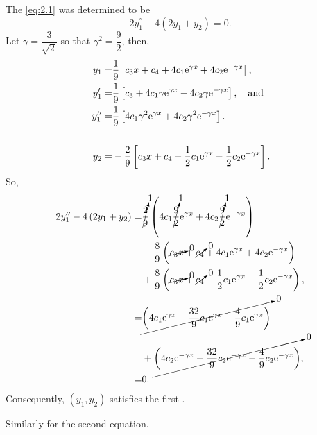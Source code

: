 \def\gm{\dfrac{3}{ \sqrt{2} } }%
\def\g2{\dfrac{9}{2}}
\def\1o9{\frac{1}{9}}%
\def\2o9{\frac{2}{9}}%
\def\4o9{\frac{4}{9}}%
\def\9o2{\frac{9}{2}}%
\def\8o9{\frac{8}{9}}%
\def\32o9{\frac{32}{9}}%
\def\egx{\e^{\gamma x}}%
\def\engx{\e^{-\gamma x}}%
The \el \eqref{eq:2.1} was determined to be
\[
	2y_1^\dprime - 4\left(2y_1+y_2\right) = 0.
\]
Let $\gamma = \gm$ so that $\gamma^2=\g2$, then,
\begin{align*}
	y_1 =& \1o9\left[c_3x + c_4 + 4c_1\e^{\gamma x} + 4c_2\e^{-\gamma x}\right],\\
	y_1^\prime =& \1o9\left[c_3  + 4c_1\gamma\e^{\gamma x} - 4c_2\gamma\e^{-\gamma x}\right],\quad\textrm{and}\\
	y_1^\dprime =&  \1o9\left[4c_1\gamma^2\e^{\gamma x} + 4c_2\gamma^2\e^{-\gamma x}\right].\\\\\
	y_2 =& -\2o9\left[c_3x + c_4-\half c_1\e^{\gamma x} -\half c_2\e^{-\gamma x} \right].
\end{align*}
So,
\begin{align*}
	2y_1^\dprime -4\left(2y_1 + y_2\right) =&\cancelto{1}{\2o9}\left(4c_1\cancelto{1}{\9o2}\e^{\gamma x} + 4c_2\cancelto{1}{\9o2}\e^{-\gamma x}\right)\\
	{}& -\8o9\left(\cancelto{0}{c_3 x} + \cancelto{0}{c_4} + 4c_1\e^{\gamma x} + 4c_2\e^{-\gamma x}\right)\\
	{}& +\8o9\left(\cancelto{0}{c_3 x} + \cancelto{0}{c_4} - \half c_1\e^{\gamma x} - \half c_2\e^{-\gamma x}\right),\\
	=& \cancelto{0}{\left(4c_1\e^{\gamma x} - \32o9c_1\e^{\gamma x}-\4o9c_1\e^{\gamma x}\right)}\\
	{}&  + \cancelto{0}{ \left( 4 c_2 \e^{-\gamma x} - \32o9 c_2 \e^{-\gamma x} - \4o9 c_2 \e^{-\gamma x}\right)},\\
	=& 0.
\end{align*}
Consequently, $\left(y_1,y_2\right)$ satisfies the first \el.

Similarly for the second \el equation.


